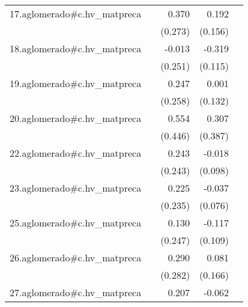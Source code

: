 {\begin{longtable}{l*{4}{D{.}{.}{-1}}}
\addlinespace
17.aglomerado#c.hv\_matpreca&                     &       0.370         &       0.192         &                     \\
            &                     &     (0.273)         &     (0.156)         &                     \\
\addlinespace
18.aglomerado#c.hv\_matpreca&                     &      -0.013         &      -0.319\sym{**} &                     \\
            &                     &     (0.251)         &     (0.115)         &                     \\
\addlinespace
19.aglomerado#c.hv\_matpreca&                     &       0.247         &       0.001         &                     \\
            &                     &     (0.258)         &     (0.132)         &                     \\
\addlinespace
20.aglomerado#c.hv\_matpreca&                     &       0.554         &       0.307         &                     \\
            &                     &     (0.446)         &     (0.387)         &                     \\
\addlinespace
22.aglomerado#c.hv\_matpreca&                     &       0.243         &      -0.018         &                     \\
            &                     &     (0.243)         &     (0.098)         &                     \\
\addlinespace
23.aglomerado#c.hv\_matpreca&                     &       0.225         &      -0.037         &                     \\
            &                     &     (0.235)         &     (0.076)         &                     \\
\addlinespace
25.aglomerado#c.hv\_matpreca&                     &       0.130         &      -0.117         &                     \\
            &                     &     (0.247)         &     (0.109)         &                     \\
\addlinespace
26.aglomerado#c.hv\_matpreca&                     &       0.290         &       0.081         &                     \\
            &                     &     (0.282)         &     (0.166)         &                     \\
\addlinespace
27.aglomerado#c.hv\_matpreca&                     &       0.207         &      -0.062         &                     \\

\end{longtable}}
